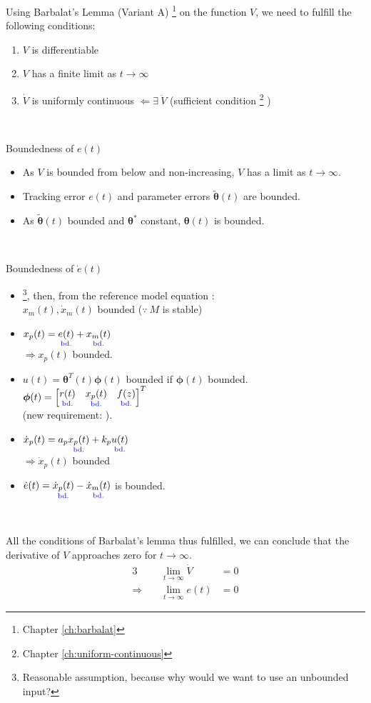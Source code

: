 Using Barbalat's Lemma (Variant A)%
\footnote{Chapter \vref{ch:barbalat}}
 on the function $V$,
we need to fulfill the following conditions:
\begin{enumerate}[label=(\roman*)]
\item $V$ is differentiable\\
\item $V$ has a finite limit as $t \rightarrow \infty$ \\
\item $\dot{V}$ is uniformly continuous $\Leftarrow \exists ~ \ddot{V}$
    (sufficient condition%
    \footnote{Chapter \vref{ch:uniform-continuous}}    
    )\\
\end{enumerate}~

Boundedness of $e(t)$
\begin{itemize}
\item As $V$ is bounded from below and non-increasing,
    $V$ has a limit as $t \rightarrow \infty$.
\item Tracking error $e(t)$ and parameter errors $ \tilde{\bm{\theta}}(t)$
    are bounded.
\item As $\tilde{\bm{\theta}}(t)$ bounded and $\bm{\theta}^*$ constant,
    $\bm{\theta}(t)$ is bounded.
\end{itemize}~

Boundedness of $\dot{e}(t)$ 
\begin{itemize}
\item {}%
    \footnote{Reasonable assumption, because why would we want
    to use an unbounded input?}, then, from the reference
    model equation :\\
    $x_m(t), \dot{x}_m(t)$ bounded ($\because~ M$ is stable)
\item $x_p(t) = \underset{\textnormal{\color{blue}bd.}}{e(t)} + \underset{\textnormal{\color{blue}bd.}}{x_m(t)}$\\
    $\Rightarrow x_p(t)$ bounded.
\item $u(t) = \bm{\theta}^T(t) \bm{\phi}(t)$ bounded if $\bm{\phi}(t)$ bounded.\\
    $\bm{\phi}(t) = \begin{bmatrix}\underset{\textnormal{\color{blue}bd.}}{r(t)} & \underset{\textnormal{\color{blue}bd.}}{x_p(t)} & \underset{\textnormal{\color{blue}bd.}}{f(z)}\end{bmatrix}^T$\\
    (new requirement: ).
\item $\dot{x}_p(t) = a_p \underset{\textnormal{\color{blue}bd.}}{x_p(t)} + k_p \underset{\textnormal{\color{blue}bd.}}{u(t)}$\\
    $\Rightarrow \dot{x}_p(t)$ bounded
\item $\dot{e}(t) = \underset{\textnormal{\color{blue}bd.}}{\dot{x}_p(t)} - \underset{\textnormal{\color{blue}bd.}}{\dot{x}_m(t)}$
    is bounded.
\end{itemize}~

All the conditions of Barbalat's lemma thus fulfilled,
we can conclude that the derivative of $V$ approaches zero
for $t \rightarrow \infty$.
\begin{alignat*}{3}
& ~ & \lim_{t \rightarrow \infty} \dot{V} &= 0\\
\Rightarrow& ~ & \lim_{t \rightarrow \infty} e(t) &= 0
\end{alignat*}


